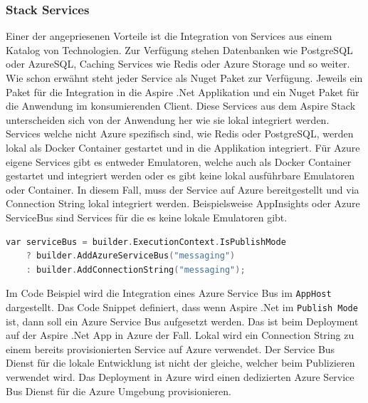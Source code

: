         \subsubsection{Stack Services}
            Einer der angepriesenen Vorteile ist die Integration von Services aus einem Katalog von Technologien. Zur Verfügung stehen Datenbanken wie PostgreSQL oder AzureSQL, Caching Services wie Redis oder Azure Storage und so weiter. Wie schon erwähnt steht jeder Service als Nuget Paket zur Verfügung. Jeweils ein Paket für die Integration in die Aspire .Net Applikation und ein Nuget Paket für die Anwendung im konsumierenden Client. 
            Diese Services aus dem Aspire Stack unterscheiden sich von der Anwendung her wie sie lokal integriert werden. Services welche nicht Azure spezifisch sind, wie Redis oder PostgreSQL, werden lokal als Docker Container gestartet und in die Applikation integriert. Für Azure eigene Services gibt es entweder Emulatoren, welche auch als Docker Container gestartet und integriert werden oder es gibt keine lokal ausführbare Emulatoren oder Container. In diesem Fall, muss der Service auf Azure bereitgestellt und via Connection String lokal integriert werden. Beispielsweise AppInsights oder Azure ServiceBus sind Services für die es keine lokale Emulatoren gibt.
            \begin{lstlisting}[language=C, caption=Beispiel der Integration eines Azure Services ohne lokale Emulation]
var serviceBus = builder.ExecutionContext.IsPublishMode
    ? builder.AddAzureServiceBus("messaging")
    : builder.AddConnectionString("messaging");
            \end{lstlisting}
            Im Code Beispiel wird die Integration eines Azure Service Bus im \verb|AppHost| dargestellt. Das Code Snippet definiert, dass wenn Aspire .Net im \verb|Publish Mode| ist, dann soll ein Azure Service Bus aufgesetzt werden. Das ist beim Deployment auf der Aspire .Net App in Azure der Fall. Lokal wird ein Connection String zu einem bereits provisionierten Service auf Azure verwendet. Der Service Bus Dienst für die lokale Entwicklung ist nicht der gleiche, welcher beim Publizieren verwendet wird. Das Deployment in Azure wird einen dedizierten Azure Service Bus Dienst für die Azure Umgebung provisionieren.

